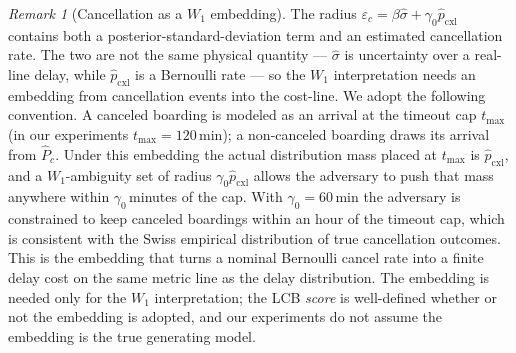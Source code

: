\documentclass[11pt]{article}
\theoremstyle{definition}
\theoremstyle{remark}
\newtheorem{remark}{Remark}
\begin{document}
\begin{remark}[Cancellation as a $W_1$ embedding]
\label{rem:cancel-embedding}
The radius $\varepsilon_c = \beta\hat\sigma + \gamma_0\hat
p_{\mathrm{cxl}}$ contains both a posterior-standard-deviation term
and an estimated cancellation rate. The two are not the same
physical quantity --- $\hat\sigma$ is uncertainty over a real-line
delay, while $\hat p_{\mathrm{cxl}}$ is a Bernoulli rate --- so the
$W_1$ interpretation needs an embedding from cancellation events
into the cost-line. We adopt the following convention. A canceled
boarding is modeled as an arrival at the timeout cap $t_{\max}$
(in our experiments $t_{\max}{=}120$\,min); a non-canceled boarding
draws its arrival from $\hat P_c$. Under this embedding the actual
distribution mass placed at $t_{\max}$ is $\hat p_{\mathrm{cxl}}$,
and a $W_1$-ambiguity set of radius $\gamma_0 \hat p_{\mathrm{cxl}}$
allows the adversary to push that mass anywhere within
$\gamma_0$\,minutes of the cap. With $\gamma_0 = 60$\,min the
adversary is constrained to keep canceled boardings within an hour
of the timeout cap, which is consistent with the Swiss empirical
distribution of true cancellation outcomes. This is the embedding
that turns a nominal Bernoulli cancel rate into a finite delay
cost on the same metric line as the delay distribution. The
embedding is needed only for the $W_1$ interpretation; the LCB
\emph{score} is well-defined whether or not the embedding is
adopted, and our experiments do not assume the embedding is the
true generating model.
\end{remark}
\end{document}
